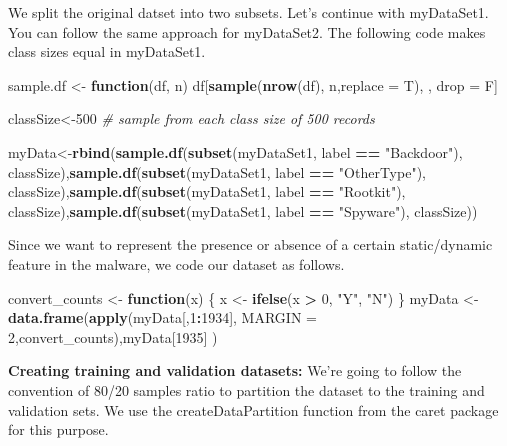 \documentclass[]{article}
\newenvironment{Shaded}{\begin{snugshade}}{\end{snugshade}}
\newcommand{\CommentTok}[1]{\textcolor[rgb]{0.56,0.35,0.01}{\textit{#1}}}
\newcommand{\ControlFlowTok}[1]{\textcolor[rgb]{0.13,0.29,0.53}{\textbf{#1}}}
\newcommand{\DataTypeTok}[1]{\textcolor[rgb]{0.13,0.29,0.53}{#1}}
\newcommand{\DecValTok}[1]{\textcolor[rgb]{0.00,0.00,0.81}{#1}}
\newcommand{\KeywordTok}[1]{\textcolor[rgb]{0.13,0.29,0.53}{\textbf{#1}}}
\newcommand{\NormalTok}[1]{#1}
\newcommand{\OperatorTok}[1]{\textcolor[rgb]{0.81,0.36,0.00}{\textbf{#1}}}
\newcommand{\StringTok}[1]{\textcolor[rgb]{0.31,0.60,0.02}{#1}}
\begin{document}
We split the original datset into two subsets. Let's continue with
myDataSet1. You can follow the same approach for myDataSet2. The
following code makes class sizes equal in myDataSet1.

\begin{Shaded}
\begin{Highlighting}[]
\NormalTok{sample.df <-}\StringTok{ }\ControlFlowTok{function}\NormalTok{(df, n) df[}\KeywordTok{sample}\NormalTok{(}\KeywordTok{nrow}\NormalTok{(df), n,}\DataTypeTok{replace =}\NormalTok{ T), , drop =}\StringTok{ }\NormalTok{F]}

\NormalTok{classSize<-}\DecValTok{500} \CommentTok{# sample from each class size of 500 records}

\NormalTok{myData<-}\KeywordTok{rbind}\NormalTok{(}\KeywordTok{sample.df}\NormalTok{(}\KeywordTok{subset}\NormalTok{(myDataSet1, label }\OperatorTok{==}\StringTok{ "Backdoor"}\NormalTok{), classSize),}\KeywordTok{sample.df}\NormalTok{(}\KeywordTok{subset}\NormalTok{(myDataSet1, label }\OperatorTok{==}\StringTok{ "OtherType"}\NormalTok{), classSize),}\KeywordTok{sample.df}\NormalTok{(}\KeywordTok{subset}\NormalTok{(myDataSet1, label }\OperatorTok{==}\StringTok{ "Rootkit"}\NormalTok{), classSize),}\KeywordTok{sample.df}\NormalTok{(}\KeywordTok{subset}\NormalTok{(myDataSet1, label }\OperatorTok{==}\StringTok{ "Spyware"}\NormalTok{), classSize))}
\end{Highlighting}
\end{Shaded}

Since we want to represent the presence or absence of a certain
static/dynamic feature in the malware, we code our dataset as follows.

\begin{Shaded}
\begin{Highlighting}[]
\NormalTok{convert_counts <-}\StringTok{ }\ControlFlowTok{function}\NormalTok{(x) \{}
\NormalTok{  x <-}\StringTok{ }\KeywordTok{ifelse}\NormalTok{(x }\OperatorTok{>}\StringTok{ }\DecValTok{0}\NormalTok{, }\StringTok{"Y"}\NormalTok{, }\StringTok{"N"}\NormalTok{)}
\NormalTok{\}}
\NormalTok{myData <-}\StringTok{ }\KeywordTok{data.frame}\NormalTok{(}\KeywordTok{apply}\NormalTok{(myData[,}\DecValTok{1}\OperatorTok{:}\DecValTok{1934}\NormalTok{], }\DataTypeTok{MARGIN =} \DecValTok{2}\NormalTok{,convert_counts),myData[}\DecValTok{1935}\NormalTok{] )}
\end{Highlighting}
\end{Shaded}

\textbf{Creating training and validation datasets:} We're going to
follow the convention of 80/20 samples ratio to partition the dataset to
the training and validation sets. We use the createDataPartition
function from the caret package for this purpose.
\end{document}
